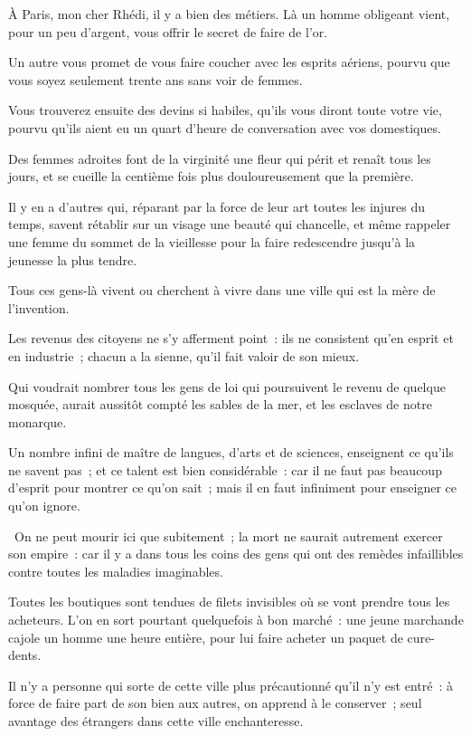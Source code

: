\documentclass[french,twoside]{book} %
\begin{document}
\noindent À Paris, mon cher Rhédi, il y a bien des métiers. Là un homme obligeant vient, pour un peu d’argent, vous offrir le secret de faire de l’or.\par
Un autre vous promet de vous faire coucher avec les esprits aériens, pourvu que vous soyez seulement trente ans sans voir de femmes.\par
Vous trouverez ensuite des devins si habiles, qu’ils vous diront toute votre vie, pourvu qu’ils aient eu un quart d’heure de conversation avec vos domestiques.\par
Des femmes adroites font de la virginité une fleur qui périt et renaît tous les jours, et se cueille la centième fois plus douloureusement que la première.\par
Il y en a d’autres qui, réparant par la force de leur art toutes les injures du temps, savent rétablir sur un visage une beauté qui chancelle, et même rappeler une femme du sommet de la vieillesse pour la faire redescendre jusqu’à la jeunesse la plus tendre.\par
Tous ces gens-là vivent ou cherchent à vivre dans une ville qui est la mère de l’invention.\par
Les revenus des citoyens ne s’y afferment point : ils ne consistent qu’en esprit et en industrie ; chacun a la sienne, qu’il fait valoir de son mieux.\par
Qui voudrait nombrer tous les gens de loi qui poursuivent le revenu de quelque mosquée, aurait aussitôt compté les sables de la mer, et les esclaves de notre monarque.\par
Un nombre infini de maître de langues, d’arts et de sciences, enseignent ce qu’ils ne savent pas ; et ce talent est bien considérable : car il ne faut pas beaucoup d’esprit pour montrer ce qu’on sait ; mais il en faut infiniment pour enseigner ce qu’on ignore.\par
 On ne peut mourir ici que subitement ; la mort ne saurait autrement exercer son empire : car il y a dans tous les coins des gens qui ont des remèdes infaillibles contre toutes les maladies imaginables.\par
Toutes les boutiques sont tendues de filets invisibles où se vont prendre tous les acheteurs. L’on en sort pourtant quelquefois à bon marché : une jeune marchande cajole un homme une heure entière, pour lui faire acheter un paquet de cure-dents.\par
Il n’y a personne qui sorte de cette ville plus précautionné qu’il n’y est entré : à force de faire part de son bien aux autres, on apprend à le conserver ; seul avantage des étrangers dans cette ville enchanteresse.\par
\end{document}

